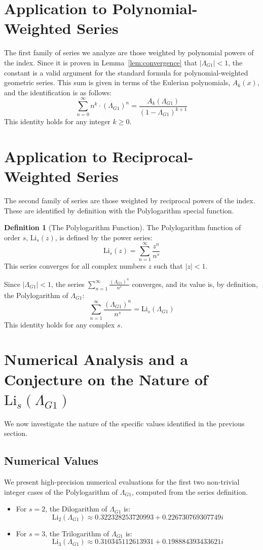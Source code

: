 \documentclass{amsart}
\theoremstyle{plain}
\theoremstyle{definition}
\newtheorem{definition}[theorem]{Definition}
\theoremstyle{remark}
\newcommand{\LambdaG}{\Lambda_{G1}}
\begin{document}
\section{Application to Polynomial-Weighted Series}
The first family of series we analyze are those weighted by polynomial powers of the index. Since it is proven in Lemma~\ref{lem:convergence} that $|\LambdaG|<1$, the constant is a valid argument for the standard formula for polynomial-weighted geometric series. This sum is given in terms of the Eulerian polynomials, $A_k(x)$, and the identification is as follows:
$$ \sum_{n=0}^{\infty} n^k \cdot (\LambdaG)^n = \frac{A_k(\LambdaG)}{(1-\LambdaG)^{k+1}} $$
This identity holds for any integer $k \ge 0$.

\section{Application to Reciprocal-Weighted Series}
The second family of series are those weighted by reciprocal powers of the index. These are identified by definition with the Polylogarithm special function.

\begin{definition}[The Polylogarithm Function]
The Polylogarithm function of order $s$, $\mathrm{Li}_s(z)$, is defined by the power series:
$$ \mathrm{Li}_s(z) = \sum_{n=1}^{\infty} \frac{z^n}{n^s} $$
This series converges for all complex numbers $z$ such that $|z|<1$.
\end{definition}

Since $|\LambdaG| < 1$, the series $\sum_{n=1}^{\infty} \frac{(\LambdaG)^{n}}{n^s}$ converges, and its value is, by definition, the Polylogarithm of $\LambdaG$:
$$ \sum_{n=1}^{\infty} \frac{(\LambdaG)^{n}}{n^s} = \mathrm{Li}_s(\LambdaG) $$
This identity holds for any complex $s$.

\section{Numerical Analysis and a Conjecture on the Nature of \texorpdfstring{$\mathrm{Li}_s(\LambdaG)$}{Li\_s(Lambda\_G1)}}
We now investigate the nature of the specific values identified in the previous section.

\subsection{Numerical Values}
We present high-precision numerical evaluations for the first two non-trivial integer cases of the Polylogarithm of $\LambdaG$, computed from the series definition.
\begin{itemize}
    \item For $s=2$, the Dilogarithm of $\LambdaG$ is:
    $$ \mathrm{Li}_2(\LambdaG) \approx 0.322328253720993 + 0.226730769307749i $$
    \item For $s=3$, the Trilogarithm of $\LambdaG$ is:
    $$ \mathrm{Li}_3(\LambdaG) \approx 0.310345112613931 + 0.198884393433621i $$
\end{itemize}
\end{document}
